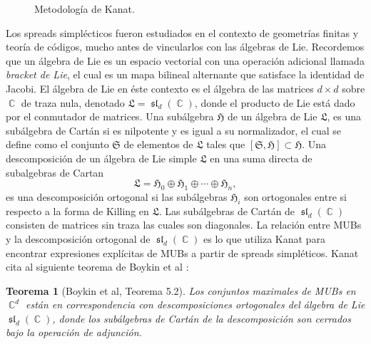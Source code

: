 \documentclass[a4paper]{report}
\DeclareMathOperator{\C}{\mathbb{C}}
\DeclareMathOperator{\Sl}{\mathfrak{sl}}
\newtheorem{theorem}{Teorema}
\begin{document}
  \begin{figure}[h]
    \centering
    \caption{Metodología de Kanat.}
    \label{diag:kanat}
  \end{figure}
  Los spreads simplécticos fueron estudiados en el contexto
  de geometrías finitas y teoría de códigos, mucho antes de
  vincularlos con las álgebras de Lie. Recordemos que un
  álgebra de Lie es un espacio vectorial con una operación
  adicional llamada \textit{bracket de Lie}, el cual es un
  mapa bilineal alternante que satisface la identidad de
  Jacobi. El álgebra de Lie en éste contexto es el álgebra
  de las matrices $d \times d$ sobre $\C$ de traza nula,
  denotado $\mathfrak{L} = \Sl_d(\C)$, donde el producto de
  Lie está dado por el conmutador de matrices. Una
  subálgebra $\mathfrak{H}$ de un álgebra de Lie
  $\mathfrak{L}$, es una subálgebra de Cartán si es
  nilpotente y es igual a su normalizador, el cual se define
  como el conjunto $\mathfrak{S}$ de elementos de
  $\mathfrak{L}$ tales que $[\mathfrak{S}, \mathfrak{H}]
  \subset \mathfrak{H}$.  Una descomposición de un álgebra
  de Lie simple $\mathfrak{L}$ en una suma directa de
  subalgebras de Cartan
  \begin{equation}
    \mathfrak{L}
    = \mathfrak{H}_0 \oplus \mathfrak{H}_1 \oplus \cdots
    \oplus \mathfrak{H}_n,
  \end{equation}
  es una descomposición ortogonal si las subálgebras
  $\mathfrak{H}_i$ son ortogonales entre si respecto a la
  forma de Killing en $\mathfrak{L}$.  Las subálgebras de
  Cartán de $\Sl_d(\C)$ consisten de matrices sin traza las
  cuales son diagonales. La relación entre MUBs y la
  descomposición ortogonal de $\Sl_d(\C)$ es lo que utiliza
  Kanat para encontrar expresiones explícitas de MUBs a
  partir de spreads simpléticos. Kanat cita al siguiente
  teorema de Boykin et al \cite{boykin2005}:
  \begin{theorem}[Boykin et al, Teorema 5.2]
    \label{thm:boykin}
    Los conjuntos maximales de MUBs en $\C^{d}$ están en
    correspondencia con descomposiciones ortogonales del
    álgebra de Lie $\Sl_d(\C)$, donde los subálgebras de
    Cartán de la descomposición son cerrados bajo la
    operación de adjunción.
  \end{theorem}
\end{document}
